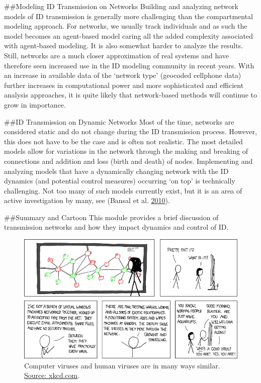 \documentclass[]{book}
\theoremstyle{definition}
\theoremstyle{definition}
\theoremstyle{definition}
\theoremstyle{remark}
\begin{document}
\#\#Modeling ID Transmission on Networks Building and analyzing network
models of ID transmission is generally more challenging than the
compartmental modeling approach. For networks, we usually track
individuals and as such the model becomes an agent-based model caring
all the added complexity associated with agent-based modeling. It is
also somewhat harder to analyze the results. Still, networks are a much
closer approximation of real systems and have therefore seen increased
use in the ID modeling community in recent years. With an increase in
available data of the `network type' (geocoded cellphone data) further
increases in computational power and more sophisticated and efficient
analysis approaches, it is quite likely that network-based methods will
continue to grow in importance.

\#\#ID Transmission on Dynamic Networks Most of the time, networks are
considered static and do not change during the ID transmission process.
However, this does not have to be the case and is often not realistic.
The most detailed models allow for variations in the network through the
making and breaking of connections and addition and loss (birth and
death) of nodes. Implementing and analyzing models that have a
dynamically changing network with the ID dynamics (and potential control
measures) occurring `on top' is technically challenging. Not too many of
such models currently exist, but it is an area of active investigation
by many, see (Bansal et al. \protect\hyperlink{ref-bansal10}{2010}).

\#\#Summary and Cartoon This module provides a brief discussion of
transmission networks and how they impact dynamics and control of ID.

\begin{figure}
\centering
\includegraphics{./images/xkcd-network.png}
\caption{\label{fig:xkcdnetwork}Computer viruses and human viruses are in
many ways similar. \href{https://xkcd.com/350/}{Source: xkcd.com}.}
\end{figure}
\end{document}
